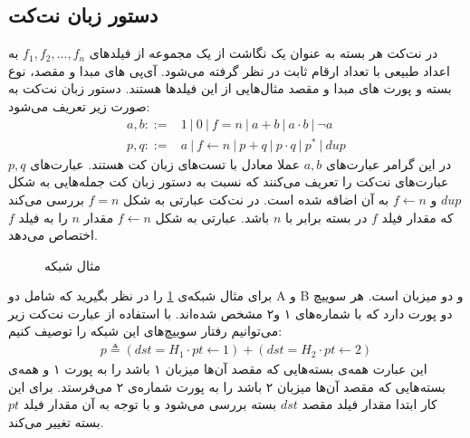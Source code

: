\documentclass[
msc,
irfonts
]{./tex/tehran-thesis}
\newcommand{\پ}{پروژه/پایان‌نامه/رساله }
\theoremstyle{definition}
\theoremstyle{theorem}
\theoremstyle{definition}
\numberwithin{algorithm}{chapter}
\newcommand{\la}{\leftarrow}
\newcommand{\lf}[1]{\LTRfootnote{#1}}
\begin{document}
\subsection{دستور زبان نت‌کت}
در نت‌کت هر بسته
به عنوان یک نگاشت از یک مجموعه از فیلد‌های
$f_1,f_2,...,f_n$
به اعداد طبیعی با تعداد ارقام ثابت در نظر گرفته می‌شود.
آی‌پی‌\lf{IP}
های مبدا و مقصد، نوع بسته و پورت‌\lf{Port}
های مبدا و مقصد مثال‌هایی از این فیلد‌ها هستند.
دستور زبان نت‌کت به صورت زیر تعریف می‌شود:
\begin{align*}
    a,b ::= & 1 ~|~ 0 ~|~ f = n ~|~ a + b ~|~ a \cdot b ~|~ \neg a  \\
    p,q ::= & a ~|~ f \la n ~|~ p + q ~|~ p \cdot q ~|~ p^* ~|~ dup
\end{align*}
در این گرامر عبارت‌های
$a,b$
عملا معادل با تست‌های زبان کت\lf{KAT}
هستند.
عبارت‌های
$p,q$
عبارت‌های نت‌کت را تعریف می‌کنند که نسبت به دستور زبان کت
جمله‌هایی به شکل
$dup$
و
$f \la n$
به آن اضافه شده است.
در نت‌کت عبارتی به شکل 
$f = n$
بررسی می‌کند که مقدار فیلد 
$f$
در بسته برابر با 
$n$
باشد.
عبارتی به شکل 
$f \la n$
مقدار 
$n$
را به فیلد 
$f$
اختصاص می‌دهد.
\begin{figure}
    \centering
    \caption{مثال شبکه}
    \label{fig:netkat:ssh}
\end{figure}
برای مثال شبکه‌ی
\ref{fig:netkat:ssh}
را در نظر بگیرید که شامل دو\lf{Switch}
A و ‌B
و دو میزبان\lf{Host}
است.
هر سوییچ دو پورت دارد که با شماره‌های ۱ و۲ مشخص شده‌اند.
با استفاده از عبارت نت‌کت زیر می‌توانیم رفتار سوییچ‌های این شبکه را توصیف کنیم:
\begin{align}
    \label{eq:netkat:swp}
    p \triangleq (dst = H_1 \cdot pt \la 1) +
    (dst = H_2 \cdot pt \la 2)
\end{align}
این عبارت همه‌ی بسته‌هایی که مقصد آن‌ها میزبان ۱ باشد را به پورت ۱ و همه‌ی بسته‌هایی که مقصد‌ آن‌ها میزبان ۲ باشد را به پورت شماره‌ی ۲ می‌فرستد.
برای این کار ابتدا مقدار فیلد مقصد 
$dst$
بسته بررسی می‌شود و با توجه به آن مقدار فیلد 
$pt$ 
بسته تغییر می‌کند.
\end{document}
